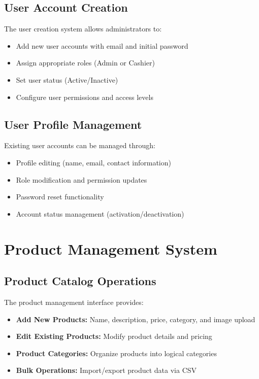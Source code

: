 \subsection*{User Account Creation}

The user creation system allows administrators to:
\begin{itemize}
  \item Add new user accounts with email and initial password
  \item Assign appropriate roles (Admin or Cashier)
  \item Set user status (Active/Inactive)
  \item Configure user permissions and access levels
\end{itemize}

\subsection*{User Profile Management}

Existing user accounts can be managed through:
\begin{itemize}
  \item Profile editing (name, email, contact information)
  \item Role modification and permission updates
  \item Password reset functionality
  \item Account status management (activation/deactivation)
\end{itemize}

\section{Product Management System}

\subsection*{Product Catalog Operations}

The product management interface provides:
\begin{itemize}
  \item \textbf{Add New Products:} Name, description, price, category, and image upload
  \item \textbf{Edit Existing Products:} Modify product details and pricing
  \item \textbf{Product Categories:} Organize products into logical categories
  \item \textbf{Bulk Operations:} Import/export product data via CSV
\end{itemize}

